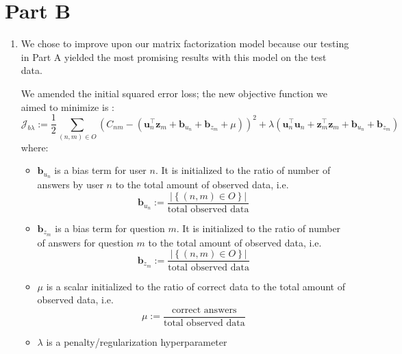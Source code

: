 \documentclass{article}
\newcommand{\mbf}[1]{\mathbf{#1}}
\begin{document}
\newpage
\section{Part B}
\begin{enumerate}[label=\arabic*.]
    \item We chose to improve upon our matrix factorization model because our testing in Part A yielded the most promising results with this model on the test data. 

        We amended the initial squared error loss; the new objective function we aimed to minimize is \cite{netflix}: \[
            \mathcal{J}_{b\lambda} := \frac{1}{2}\sum_{(n, m)\in O}{\left(C_{nm}-\left(\mbf u_n^\top \mbf z_m+\mbf b_{u_n}+\mbf b_{z_m}+\mu\right)\right)^2+\lambda \left(\mbf u_n^\top\mbf u_n+\mbf z_m^\top\mbf z_m+\mbf b_{u_n}+\mbf b_{z_m}\right)}
        \] where:
        \begin{itemize}
            \item $\mbf b_{u_n}$ is a bias term for user $n$. It is initialized to the ratio of number of answers by user $n$ to the total amount of observed data, i.e. \[
                    \mbf b_{u_n} := \frac{\left|\left\{(n, m)\in O\right\}\right|}{\text{total observed data}}
            \] 
            \item $\mbf b_{z_m}$ is a bias term for question $m$. It is initialized to the ratio of number of answers for question $m$ to the total amount of observed data, i.e. \[
                    \mbf b_{z_m} := \frac{\left|\left\{(n, m)\in O\right\}\right|}{\text{total observed data}}
            \] 
            \item $\mu$ is a scalar initialized to the ratio of correct data to the total amount of observed data, i.e. \[
            \mu := \frac{\text{correct answers}}{\text{total observed data}}
            \] 
            \item $\lambda$ is a penalty/regularization hyperparameter
        \end{itemize}


\end{enumerate}
\end{document}
